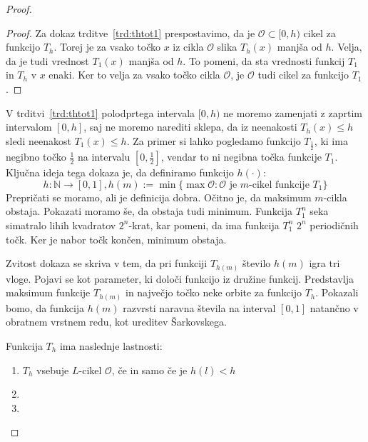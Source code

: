 \documentclass[mat2]{fmfdelo}
\newcommand{\N}{\mathbb N}
\begin{document}
\begin{proof}
\begin{proof}
Za dokaz trditve~\ref{trd:thtot1} prespostavimo, da je $\mathcal{O} \subset [0, h)$ cikel za funkcijo $T_h$. Torej je za vsako točko $x$ iz cikla $\mathcal{O}$ slika $T_h(x)$ manjša od $h$. Velja, da je tudi vrednost $T_1(x)$ manjša od $h$. To pomeni, da sta vrednosti funkcij $T_1$ in $T_h$ v $x$ enaki. Ker to velja za vsako točko cikla $\mathcal{O}$, je $\mathcal{O}$ tudi cikel za funkcijo $T_1$.
\end{proof}
V trditvi~\ref{trd:thtot1} polodprtega intervala $[0, h)$ ne moremo zamenjati z zaprtim intervalom $[0, h]$, saj ne moremo narediti sklepa, da iz neenakosti $T_h(x) \leq h$ sledi neenakost $T_1(x) \leq h$. Za primer si lahko pogledamo funkcijo $T_{\frac{1}{2}}$, ki ima negibno točko $\frac{1}{2}$ na intervalu $[0, \frac{1}{2}]$, vendar to ni negibna točka funkcije $T_1$.
Ključna ideja tega dokaza je, da definiramo funkcijo $h(\cdot)$:
$$h: \N \to [0, 1], h(m) := \min\{\max \mathcal{O}: \mathcal{O}\text{ je }m\text{-cikel funkcije }T_1 \}$$
Prepričati se moramo, ali je definicija dobra. Očitno je, da maksimum $m$-cikla obstaja. Pokazati moramo še, da obstaja tudi minimum. Funkcija $T_1^n$ seka simatralo lihih kvadratov $2^n$-krat, kar pomeni, da ima funkcija $T_1^n$ $2^n$ periodičnih točk. Ker je nabor točk končen, minimum obstaja.

Zvitost dokaza se skriva v tem, da pri funkciji $T_{h(m)}$ število $h(m)$ igra tri vloge. Pojavi se kot parameter, ki določi funkcijo iz družine funkcij. Predstavlja maksimum funkcije $T_{h(m)}$ in največjo točko neke orbite za funkcijo $T_h$. Pokazali bomo, da funkcija $h(m)$ razvrsti naravna števila na interval $[0, 1]$ natančno v obratnem vrstnem redu, kot ureditev Šarkovskega.

Funkcija $T_h$ ima naslednje lastnosti:
\begin{enumerate}
\item $T_h$  vsebuje $L$-cikel $\mathcal{O}$, če in samo če je $h(l)<h$
\item
\item
\end{enumerate}
\end{proof}
\end{document}
